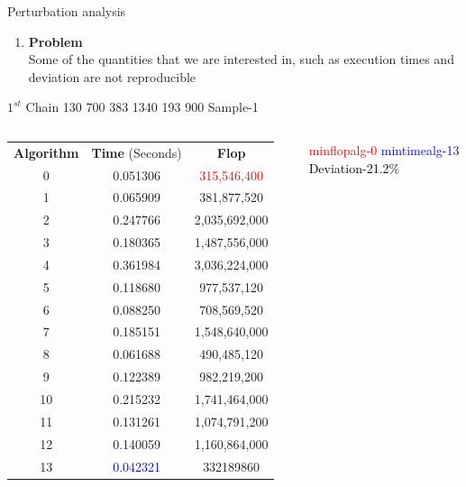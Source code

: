 \documentclass[10pts]{beamer}
\begin{document}
	  
	  
	  
	   \begin{frame}[t]{Perturbation analysis }
	   
	
	    \begin{enumerate}[(\roman{*})]
	     \item \textbf{Problem} \\
	    Some of the quantities that we are interested in, such as execution times and deviation are not reproducible
	    \end{enumerate}
	     
	    
	 
	   \end{frame} 
	   
	   
	   
	    \begin{frame}{$1^{st}$ Chain 130 700 383 1340 193 900 \hspace{75pt}   Sample-1  }
	    	\begin{columns}
	    		
	    		\begin{tabular}{c | c | c}
	    			\textbf{Algorithm}  & \textbf{Time} (Seconds) & \textbf{Flop}\\		
	    			0	&   0.051306	&	\textcolor{red}{315,546,400}\\
	    			1	&	0.065909 	&	381,877,520\\
	    			2 	&	0.247766 	&	2,035,692,000\\
	    			3 	&	0.180365 	&	1,487,556,000 \\
	    			4 	&	0.361984 	&	3,036,224,000\\
	    			5 	&	0.118680 	&	977,537,120\\
	    			6	&    0.088250 	&	708,569,520\\
	    			7 	&	0.185151 	&	1,548,640,000\\
	    			8 	&	0.061688 	&	490,485,120\\
	    			9 	&	0.122389 	&	982,219,200\\
	    			10 	&	0.215232 	&	1,741,464,000\\
	    			11 	&	0.131261 	&	1,074,791,200\\
	    			12 	&	0.140059 	&	1,160,864,000\\
	    			13 	&	\textcolor{blue}{0.042321} 	&	332189860	
	    			
	    		\end{tabular}
	    		
	    		
	    		\textcolor{red}{min\textunderscore flop\textunderscore alg-0}
	    		\textcolor{blue}{min\textunderscore time\textunderscore alg-13}
	    		\textcolor{black}{Deviation-21.2\%}
	    	\end{columns}
	    \end{frame} 
\end{document}
